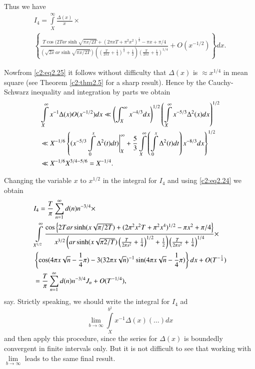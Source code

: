 Thus we have
{\fontsize{10}{12}\selectfont
\begin{multline*}
  I_4 = \int\limits_X^\infty \frac{\Delta  (x)}{x}\times\\ 
  \left\{\frac{T
    \cos (2 T ar \sinh \sqrt{\pi x/2T} + (2 \pi xT + \pi^2
    x^2)^{\frac{1}2} - \pi x+ \pi/4}{(\sqrt{2 x} ar \sinh \sqrt{\pi
      x/2 T}) \left( \left( \frac{T}{2 \pi x} +
    \frac{1}{4}\right)^{\frac{1}{2}}+ \frac{1}{2} \right) \left(
    \frac{T}{2 \pi x} + \frac{1}{4}\right)^{1/4}}+ O (x^{-1/2}) \right\}dx.
\end{multline*}}

Now\pageoriginale from \eqref{c2:eq2.25} it follows without difficulty
that $\Delta  (x)$ is $\approx x^{1/4}$ in mean square (see Theorem
\ref{c2:thm2.5} for a sharp result). Hence by the Cauchy-Schwarz
inequality and integration by parts we obtain
\begin{align}
  & \int\limits_X^\infty x^{-1} \Delta  (x) O (x^{-1/2}) dx \ll
  \left(\int_X^\infty x^{- 4/3} dx \right)^{1/2}
  \left(\int\limits_X^\infty x^{-5/3} \Delta ^2 (x) dx
  \right)^{1/2}\label{c2:eq2.62}\\
  & \ll X^{-1/6} \left\{(x^{-5/3} \int\limits_0^x \Delta ^2 (t) dt)
  \Bigg|_X^\infty + \frac{5}{3} \int\limits_X^\infty
  \left(\int\limits_0^x \Delta ^2 (t) dt \right) x^{- 8/3}dx
  \right\}^{1/2}\notag\\
  & \ll X^{-1/6}X^{3/4-5/6}= X^{-1/4}.\notag
\end{align}

Changing the variable $x$ to $x^{1/2}$ in the integral for $I_4$ and
using \eqref{c2:eq2.24} we obtain
\begin{align}
  & I_4 = \frac{T}{\pi} \sum_{n=1}^\infty d(n) n^{-3/4}
  \times \label{c2:eq2.63}\\ 
  &  \int\limits_{X^{1/2}}^\infty \frac{\cos \left\{2T ar \sinh
    (x \sqrt{\pi /2T})+ (2 \pi^2 x^2 T + \pi^2 x^4)^{1/2}- \pi x^2+
    \pi/4 \right\}}{x^{3/2} \left(ar \sinh (x \sqrt{\pi 2/T})
    \left(\frac{T}{2 \pi x^2} + \frac{1}{4} \right)^{1/2} +
    \frac{1}{2}\right) \left(\frac{T}{2 \pi x^2} + \frac{1}{4}
    \right)^{1/4}}\times\notag\\ 
  &  \left\{\cos (4 \pi x\sqrt{n} - \frac{1}{4} \pi) - 3 (32 \pi
  x \sqrt{n})^{-1} \sin (4 \pi x \sqrt{n} - \frac{1}{4}\pi) \right\}dx +
  O(T^{- \frac{1}{4}})\notag\\
  & = \frac{T}{\pi} \sum^\infty_{n=1} d(n) n^{- 3/4}J_n + O(T^{- 1/4}),\notag
\end{align}
say. Strictly speaking, we should write the integral for $I_4$ ad 
$$
\lim\limits_{b \to \infty} \int\limits_{X}^{b^2} x^{-1} \Delta  (x)
(\ldots) dx
$$
and then apply this procedure, since the series for $\Delta  (x)$ is
boundedly convergent in finite intervals only. But it is not difficult
to see that working with $\displaystyle{\lim\limits_{b \to \infty}}$
leads to the same final result.

